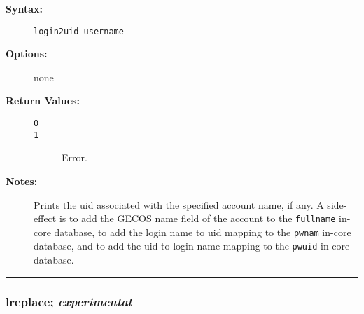 \begin{description}
\item[{\bf Syntax:}] \mbox{}

{\tt login2uid username}

\item[{\bf Options:}] \mbox{}

none  

\item[{\bf Return Values:}] \mbox{}

\begin{description}
\item[{\tt 0}] \mbox{}



\item[{\tt 1}] \mbox{}

Error.

\end{description}


\item[{\bf Notes:}] \mbox{}

Prints the uid associated with the specified
account name, if any. A side-effect is to add the GECOS name field of 
the account to the {\tt fullname} in-core database, to add the login 
name to uid mapping to the {\tt pwnam} in-core database, and to add 
the uid to login name mapping to the {\tt pwuid} in-core database.

\end{description}


\hrule
\subsubsection{lreplace; \em experimental}

